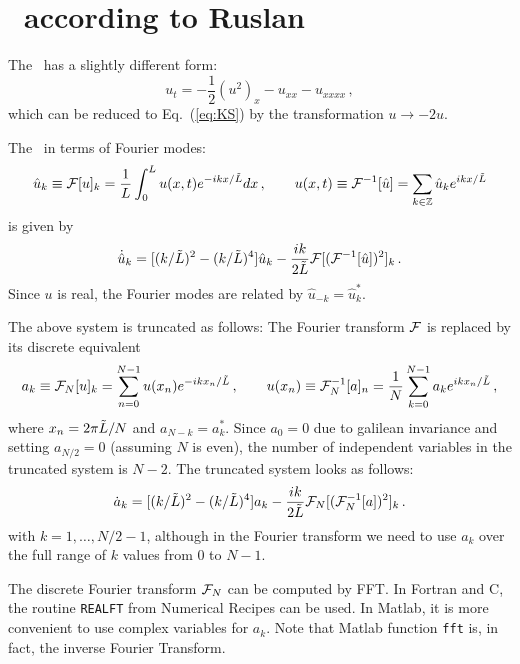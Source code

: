 %


\section{\KS\ according to Ruslan}
\label{sec:fourierRLD}

%
The \KSe\ has a slightly different form:
\begin{equation}
  u_t=-{\textstyle\frac{1}{2}}(u^2)_x-u_{xx}- u_{xxxx} \, ,
\end{equation}
which can be reduced to Eq.~(\ref{eq:KS}) by the transformation $u
\rightarrow -2u$.

The \KSe\ in terms of Fourier modes:
\begin{equation}
  \hat{u}_k \equiv {\cal F}[u]_k = \frac{1}{L}\int_0^L u(x,t) e^{-ikx/\tilde{L}}dx\,,
  \qquad u(x,t) \equiv {\cal F}^{-1}[\hat{u}] = \sum_{k\in{\mathbb Z}} \hat{u}_k e^{ikx/\tilde{L}}
\end{equation}
 is given by
\begin{equation}
  \dot{\hat{u}}_k =[(k/\tilde{L})^2-(k/\tilde{L})^4]\hat{u}_k -
  \frac{ik}{2\tilde{L}}{\cal F}[({\cal F}^{-1}[\hat{u}])^2]_k\,.
\end{equation}
Since $u$ is real, the Fourier modes are related by $\hat{u}_{-k} =
\hat{u}^\ast_k$.

The above system is truncated as follows: The Fourier transform
${\cal F}$ is replaced by its discrete equivalent
\begin{equation}
  a_k \equiv {\cal F}_N[u]_k = \sum_{n = 0}^{N-1} u(x_n)
  e^{-ikx_n/\tilde{L}}\,,\qquad u(x_n) \equiv {\cal F}_N^{-1}[a]_n
  = \frac{1}{N}\sum_{k = 0}^{N-1} a_k e^{ikx_n/\tilde{L}}\,,
\end{equation}
where $x_n = 2\pi\tilde{L}/N$ and $a_{N-k} = a^\ast_k$.  Since $a_0
= 0$ due to galilean invariance and setting $a_{N/2} = 0$ (assuming
$N$ is even), the number of independent variables in the truncated
system is $N-2$.  The truncated system looks as follows:
\begin{equation}
  \dot{a}_k =[(k/\tilde{L})^2-(k/\tilde{L})^4]a_k -
  \frac{ik}{2\tilde{L}}{\cal F}_N[({\cal F}_N^{-1}[a])^2]_k\,.
\end{equation}
with $k = 1,\ldots,N/2-1$, although in the Fourier transform we need
to use $a_k$ over the full range of $k$ values from 0 to $N-1$.

The discrete Fourier transform ${\cal F}_N$ can be computed by FFT.
In Fortran and C, the routine {\tt REALFT} from Numerical Recipes
can be used.  In Matlab, it is more convenient to use complex
variables for $a_k$.  Note that Matlab function {\tt fft} is, in
fact, the inverse Fourier Transform.

